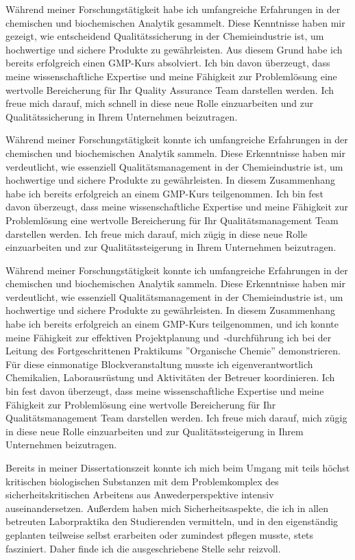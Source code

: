     {Während meiner Forschungstätigkeit habe ich umfangreiche Erfahrungen in der chemischen und biochemischen Analytik gesammelt. Diese Kenntnisse haben mir gezeigt, wie entscheidend Qualitätssicherung in der Chemieindustrie ist, um hochwertige und sichere Produkte zu gewährleisten. Aus diesem Grund habe ich bereits erfolgreich einen GMP-Kurs absolviert. Ich bin davon überzeugt, dass meine wissenschaftliche Expertise und meine Fähigkeit zur Problemlösung eine wertvolle Bereicherung für Ihr Quality Assurance Team darstellen werden. Ich freue mich darauf, mich schnell in diese neue Rolle einzuarbeiten und zur Qualitätssicherung in Ihrem Unternehmen beizutragen.\par }{}
    {Während meiner Forschungstätigkeit konnte ich umfangreiche Erfahrungen in der chemischen und biochemischen Analytik sammeln. Diese Erkenntnisse haben mir verdeutlicht, wie essenziell Qualitätsmanagement in der Chemieindustrie ist, um hochwertige und sichere Produkte zu gewährleisten. In diesem Zusammenhang habe ich bereits erfolgreich an einem GMP-Kurs teilgenommen. Ich bin fest davon überzeugt, dass meine wissenschaftliche Expertise und meine Fähigkeit zur Problemlösung eine wertvolle Bereicherung für Ihr Qualitätsmanagement Team darstellen werden. Ich freue mich darauf, mich zügig in diese neue Rolle einzuarbeiten und zur Qualitätssteigerung in Ihrem Unternehmen beizutragen.\par }{}
    {Während meiner Forschungstätigkeit konnte ich umfangreiche Erfahrungen in der chemischen und biochemischen Analytik sammeln. Diese Erkenntnisse haben mir verdeutlicht, wie essenziell Qualitätsmanagement in der Chemieindustrie ist, um hochwertige und sichere Produkte zu gewährleisten. In diesem Zusammenhang habe ich bereits erfolgreich an einem GMP-Kurs teilgenommen, und ich konnte meine Fähigkeit zur effektiven Projektplanung \mbox{und -durchführung} ich bei der Leitung des Fortgeschrittenen Praktikums ''Organische Chemie'' demonstrieren. Für diese einmonatige Blockveranstaltung musste ich eigenverantwortlich Chemikalien, Laborausrüstung und Aktivitäten der Betreuer koordinieren. Ich bin fest davon überzeugt, dass meine wissenschaftliche Expertise und meine Fähigkeit zur Problemlösung eine wertvolle Bereicherung für Ihr Qualitätsmanagement Team darstellen werden. Ich freue mich darauf, mich zügig in diese neue Rolle einzuarbeiten und zur Qualitätssteigerung in Ihrem Unternehmen beizutragen.\par }{}
    {Bereits in meiner Dissertationszeit konnte ich mich beim Umgang mit teils höchst kritischen biologischen Substanzen mit dem Problemkomplex des sicherheitskritischen Arbeitens aus Anwederperspektive intensiv auseinandersetzen. Außerdem haben mich Sicherheitsaspekte, die ich in allen betreuten Laborpraktika den Studierenden vermitteln, und in den eigenständig geplanten teilweise selbst erarbeiten oder zumindest pflegen musste, stets fasziniert. Daher finde ich die ausgeschriebene Stelle sehr reizvoll. \par }{}

